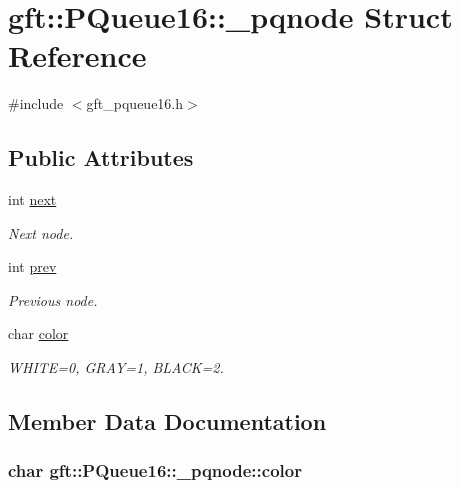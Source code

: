 \hypertarget{structgft_1_1PQueue16_1_1__pqnode}{\section{gft\-:\-:P\-Queue16\-:\-:\-\_\-pqnode Struct Reference}
\label{structgft_1_1PQueue16_1_1__pqnode}
}


{\ttfamily \#include $<$gft\-\_\-pqueue16.\-h$>$}

\subsection*{Public Attributes}
\begin{DoxyCompactItemize}
\item 
int \hyperlink{structgft_1_1PQueue16_1_1__pqnode_ae134e5ac0719e6f167a30bc0f6db8c82}{next}
\begin{DoxyCompactList}\small\item\em Next node. \end{DoxyCompactList}\item 
int \hyperlink{structgft_1_1PQueue16_1_1__pqnode_a3f2d4b2b31360fd45e1f61cde5ebec41}{prev}
\begin{DoxyCompactList}\small\item\em Previous node. \end{DoxyCompactList}\item 
char \hyperlink{structgft_1_1PQueue16_1_1__pqnode_a8dbd4c180d9f604dbf1ec338a32a49af}{color}
\begin{DoxyCompactList}\small\item\em W\-H\-I\-T\-E=0, G\-R\-A\-Y=1, B\-L\-A\-C\-K=2. \end{DoxyCompactList}\end{DoxyCompactItemize}


\subsection{Member Data Documentation}
\hypertarget{structgft_1_1PQueue16_1_1__pqnode_a8dbd4c180d9f604dbf1ec338a32a49af}{
\subsubsection[{color}]{\setlength{\rightskip}{0pt plus 5cm}char gft\-::\-P\-Queue16\-::\-\_\-pqnode\-::color}}\label{structgft_1_1PQueue16_1_1__pqnode_a8dbd4c180d9f604dbf1ec338a32a49af}


